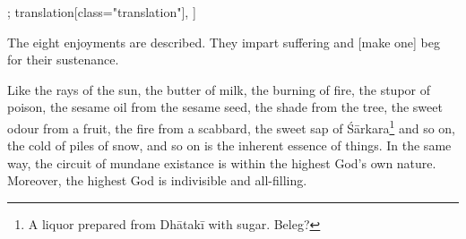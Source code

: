 \begin{alignment}[
  texts=edition[class="edition"];
  translation[class="translation"],
]
\begin{translation}
\begin{tlate}[p22_04]
  The eight enjoyments are described. They impart suffering and [make one] beg for their sustenance.\\
    \end{tlate}
    \begin{tlate}[p22_05]
  Like the rays of the sun, the butter of milk, the burning of fire, the stupor of poison, the sesame oil from the sesame seed, 
  the shade from the tree, the sweet odour from a fruit, the fire from a scabbard,
   the sweet sap of Śārkara\footnote{A liquor prepared from Dhātakī with sugar. Beleg?} 
   and so on, the cold of piles of snow, and so on is the inherent essence of things.
   In the same way, the circuit of mundane existance is within the highest God's own nature. 
   Moreover, the highest God is indivisible and all-filling.
  \label{endsvabhava}
   \flushpage 
  \end{tlate}
\end{translation}
\end{alignment}
\pagebreak %
